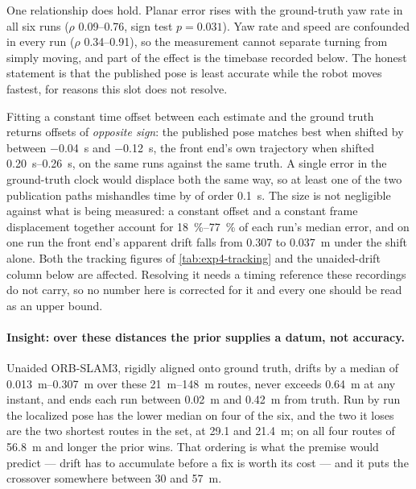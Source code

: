 \documentclass[11pt,a4paper,notitlepage]{report}
\begin{document}
One relationship does hold. Planar error rises with the ground-truth yaw rate
in all six runs ($\rho$ \numrange{0.09}{0.76}, sign test $p = \num{0.031}$).
 Yaw rate and speed are confounded in
every run ($\rho$ \numrange{0.34}{0.91}), so the measurement cannot separate
turning from simply moving, and part of the effect is the timebase recorded
below. The honest statement is that the published pose is least accurate while
the robot moves fastest, for reasons this slot does not resolve.

 Fitting a constant time offset between each estimate and the ground
truth returns offsets of \emph{opposite sign}: the published pose matches best
when shifted by between \SI{-0.04}{\second} and \SI{-0.12}{\second}, the front end's own trajectory
when shifted \SIrange{+0.20}{+0.26}{\second}, on the same runs against the same
truth. A single error in the ground-truth clock would displace both the same
way, so at least one of the two publication paths mishandles time by of order
\SI{0.1}{\second}. The size is not negligible against what is being measured: a
constant offset and a constant frame displacement together account for
\SIrange{18}{77}{\percent} of each run's median error, and on one run the
front end's apparent drift falls from \SI{0.307}{} to \SI{0.037}{\metre} under
the shift alone. Both the tracking figures of \cref{tab:exp4-tracking} and the
unaided-drift column below are affected. Resolving it needs a timing reference
these recordings do not carry, so no number here is corrected for it and every
one should be read as an upper bound.

\paragraph{Insight: over these distances the prior supplies a datum, not
accuracy.}  Unaided ORB-SLAM3, rigidly aligned onto ground truth, drifts by a
median of \SIrange{0.013}{0.307}{\metre} over these \SIrange{21}{148}{\metre}
routes, never exceeds \SI{0.64}{\metre} at any instant, and ends each run
between \SI{0.02}{\metre} and \SI{0.42}{\metre} from truth. Run by run the
localized pose has the lower median on four of the six, and the two it loses
are the two shortest routes in the set, at \SI{29.1}{} and \SI{21.4}{\metre};
on all four routes of \SI{56.8}{\metre} and longer the prior wins. That
ordering is what the premise would predict --- drift has to accumulate before a
fix is worth its cost --- and it puts the crossover somewhere between
\SI{30}{} and \SI{57}{\metre}.
\end{document}
